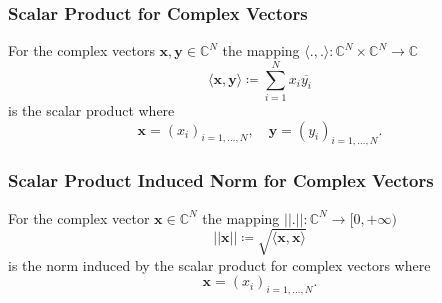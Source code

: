 
\begin{frame}
    \frametitle{Scalar Product for Complex Vectors}
    \begin{Def}\label{def:scalar_product_complex_vectors}
      For the complex vectors $\boldsymbol{x},\boldsymbol{y} \in \mathbb{C}^N$ the mapping  $\langle\boldsymbol{.},\boldsymbol{.}\rangle \colon \mathbb{C}^N \times \mathbb{C}^N \to \mathbb{C}$ 
      \begin{equation}
          \langle\boldsymbol{x},\boldsymbol{y}\rangle \coloneqq \sum_{i=1}^{N} x_i \overline{y_i} 
      \end{equation}
      is the scalar product where
      \begin{equation}
          \boldsymbol{x} = \left(x_i\right)_{i=1,\ldots,N}, \quad \boldsymbol{y} = \left(y_i\right)_{i=1,\ldots,N}.
      \end{equation}    
  \end{Def}
  \end{frame}
  
  \begin{frame}
    \frametitle{Scalar Product Induced Norm for Complex Vectors}
    \begin{Def}\label{def:scalar_product_induced_norm_complex_vectors}
      For the complex vector $\boldsymbol{x} \in \mathbb{C}^N$ the mapping  $\left|\left|\boldsymbol{.}\right|\right| \colon \mathbb{C}^N \to [0,+\infty)$ 
      \begin{equation}
          \left|\left|\boldsymbol{x}\right|\right| \coloneqq  \sqrt{\langle\boldsymbol{x},\boldsymbol{x}\rangle}
      \end{equation}
      is the norm induced by the scalar product for complex vectors where
      \begin{equation}
          \boldsymbol{x} = \left(x_i\right)_{i=1,\ldots,N}.
      \end{equation}    
  \end{Def}
  \end{frame}
  
  
